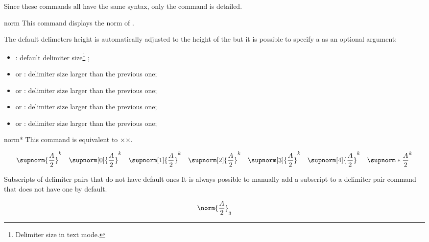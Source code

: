 \documentclass[english,nolocaltoc]{nwejmart}
\newtheorem[style=definition]{fact}
\newtheorem[title=experience]{experience}
\newtheorem[title-plural=rings]{ring}
\newtheorem[title=ideal,title-plural=ideals]{ideal}
\begin{document}
Since these commands all have the same syntax, only the
 command  is detailed.

\begin{docCommand*}{norm}{}
  This command displays the norm of .

  The default delimeters height is automatically adjusted to the
  height of the  but it is possible to specify a
   as an optional argument:
  \begin{itemize}
  \item {}: default  delimiter size\footnote{Delimiter size in text mode.} ;
  \item {} or : delimiter size larger
    than the previous one;
  \item {} or : delimiter size larger
    than the previous one;
  \item {} or : delimiter size larger
    than the previous one;
  \item {} or : delimiter size larger
    than the previous one;
  \end{itemize}
\end{docCommand*}

\begin{docCommand}{norm*}{}
  This command is equivalent to ××.
\end{docCommand}

\begin{bodycode}
\begin{equation}
\supnorm{\frac{A}{2}}^k    \quad
\supnorm[0]{\frac{A}{2}}^k \quad
\supnorm[1]{\frac{A}{2}}^k \quad
\supnorm[2]{\frac{A}{2}}^k \quad
\supnorm[3]{\frac{A}{2}}^k \quad
\supnorm[4]{\frac{A}{2}}^k \quad
\supnorm*{\frac{A}{2}}^k
\end{equation}
\end{bodycode}

\begin{dbremark}{Subscripts of delimiter pairs that do not have default ones}{}
  It is always possible to manually add a subscript to a delimiter
  pair command that does not have one by default. 
\begin{bodycode}
\begin{equation}
\norm{\frac{A}{2}}_3
\end{equation}
\end{bodycode}
\end{dbremark}
\end{document}
